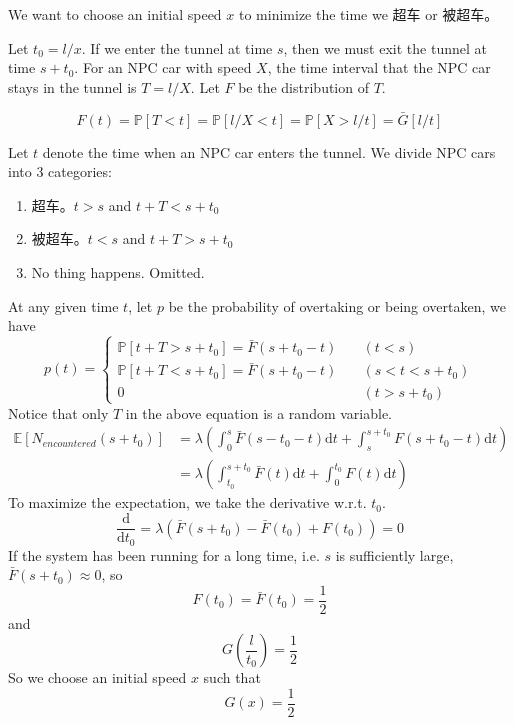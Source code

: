         We want to choose an initial speed $x$ to minimize the time we 超车 or 被超车。

        Let $t_0 = l/x$. If we enter the tunnel at time $s$, then we must exit the tunnel at time $s + t_0$. For an NPC car with speed $X$, the time interval that the NPC car stays in the tunnel is $T=l/X$. Let $F$ be the distribution of $T$.

        \[ F(t) = \mathbb{P}[T < t] = \mathbb{P}[l/X < t] = \mathbb{P}[X > l/t] = \bar{G}[l/t] \]

        Let $t$ denote the time when an NPC car enters the tunnel. We divide NPC cars into $3$ categories:
        \begin{enumerate}
            \item 超车。$t > s$ and $t + T < s + t_0$
            \item 被超车。$t < s$ and $t + T > s + t_0$
            \item No thing happens. Omitted.
        \end{enumerate}
        At any given time $t$, let $p$ be the probability of overtaking or being overtaken, we have
        \[
            p(t) =
            \begin{cases}
                \mathbb{P}[t + T > s + t_0] = \bar{F}(s+t_0-t) \quad &(t < s)\\
                \mathbb{P}[t + T < s + t_0] = \bar{F}(s+t_0-t) \quad &(s < t < s+t_0)\\
                0 \quad &(t > s + t_0)
            \end{cases}
        \]
        Notice that only $T$ in the above equation is a random variable.
        \begin{align*}
            \mathbb{E}[N_{encountered}(s+t_0)] &= \lambda \left( \int_0^s \bar{F}(s-t_0-t)\mathrm{d}t + \int_s^{s+t_0} F(s+t_0-t)\mathrm{d}t \right)\\
            &= \lambda \left( \int_{t_0}^{s+t_0} \bar{F}(t)\mathrm{d}t + \int_0^{t_0} F(t)\mathrm{d}t \right)
        \end{align*}
        To maximize the expectation, we take the derivative w.r.t. $t_0$.
        \[ \frac{\mathrm{d}}{\mathrm{d}t_0} = \lambda \left( \bar{F}(s+t_0) - \bar{F}(t_0) + F(t_0) \right) = 0 \]
        If the system has been running for a long time, i.e. $s$ is sufficiently large, $\bar{F}(s+t_0) \approx 0$, so
        \[ F(t_0) = \bar{F}(t_0) = \frac{1}{2} \]
        and
        \[ G\left(\frac{l}{t_0}\right) = \frac{1}{2} \]
        So we choose an initial speed $x$ such that
        \[ G(x) = \frac{1}{2} \]


